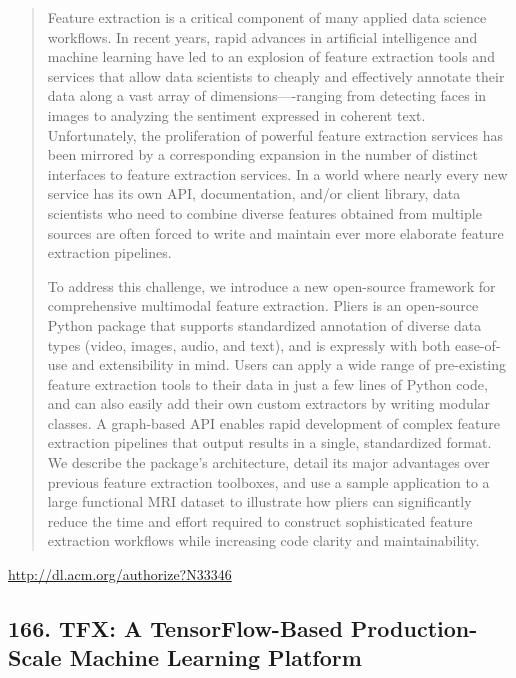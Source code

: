 \documentclass{article}
\begin{document}
\begin{quote}
Feature extraction is a critical component of many applied data science workflows. In recent years, rapid advances in artificial intelligence and machine learning have led to an explosion of feature extraction tools and services that allow data scientists to cheaply and effectively annotate their data along a vast array of dimensions—-ranging from detecting faces in images to analyzing the sentiment expressed in coherent text. Unfortunately, the proliferation of powerful feature extraction services has been mirrored by a corresponding expansion in the number of distinct interfaces to feature extraction services. In a world where nearly every new service has its own API, documentation, and/or client library, data scientists who need to combine diverse features obtained from multiple sources are often forced to write and maintain ever more elaborate feature extraction pipelines.







  To address this challenge, we introduce a new open-source framework for comprehensive multimodal feature extraction. Pliers is an open-source Python package that supports standardized annotation of diverse data types (video, images, audio, and text), and is expressly with both ease-of-use and extensibility in mind. Users can apply a wide range of pre-existing feature extraction tools to their data in just a few lines of Python code, and can also easily add their own custom extractors by writing modular classes. A graph-based API enables rapid development of complex feature extraction pipelines that output results in a single, standardized format. We describe the package’s architecture, detail its major advantages over previous feature extraction toolboxes, and use a sample application to a large functional MRI dataset to illustrate how pliers can significantly reduce the time and effort required to construct sophisticated feature extraction workflows while increasing code clarity and maintainability.
\end{quote}

\href{http://dl.acm.org/authorize?N33346}{http://dl.acm.org/authorize?N33346}

\subsection{166. TFX: A TensorFlow-Based Production-Scale Machine Learning Platform}
\end{document}
